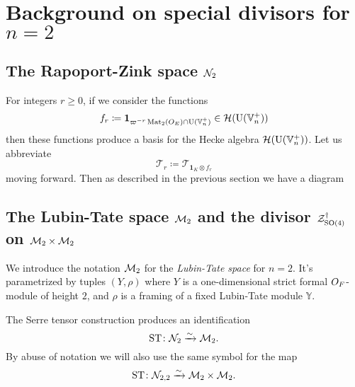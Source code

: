 \section{Background on special divisors for $n = 2$}
\subsection{The Rapoport-Zink space $\mathcal N_2$}
For integers $r \ge 0$, if we consider the functions
\[ f_r \coloneqq \mathbf{1}_{\varpi^{-r} \operatorname{Mat}_2(O_E) \cap \operatorname{U}(\mathbb V_n^+)} \in \mathcal H(\operatorname{U}(\mathbb V_n^+)) \]
then these functions produce a basis for the Hecke algebra $\mathcal H(\operatorname{U}(\mathbb V_n^+))$.
Let us abbreviate
\[ \mathcal{T}_r \coloneqq \mathcal{T}_{\mathbf{1}_K \otimes f_r} \]
moving forward.
Then as described in the previous section we have a diagram
\begin{center}
\end{center}

\subsection{The Lubin-Tate space $\mathcal M_2$ and the divisor $\mathcal Z^{\dagger}_{\operatorname{SO}(4)}$ on $\mathcal M_2 \times \mathcal M_2$}
We introduce the notation $\mathcal M_2$ for the \emph{Lubin-Tate space} for $n = 2$.
It's parametrized by tuples $(Y, \rho)$
where $Y$ is a one-dimensional strict formal $O_F$-module of height $2$,
and $\rho$ is a framing of a fixed Lubin-Tate module $\mathbb{Y}$.

\begin{proposition}
  The Serre tensor construction produces an identification
  \[ \operatorname{ST} \colon \mathcal N_2 \xrightarrow{\sim} \mathcal M_2. \]
  By abuse of notation we will also use the same symbol for the map
  \[ \operatorname{ST} \colon \mathcal N_{2,2} \xrightarrow{\sim} \mathcal M_2 \times \mathcal M_2. \]
\end{proposition}

